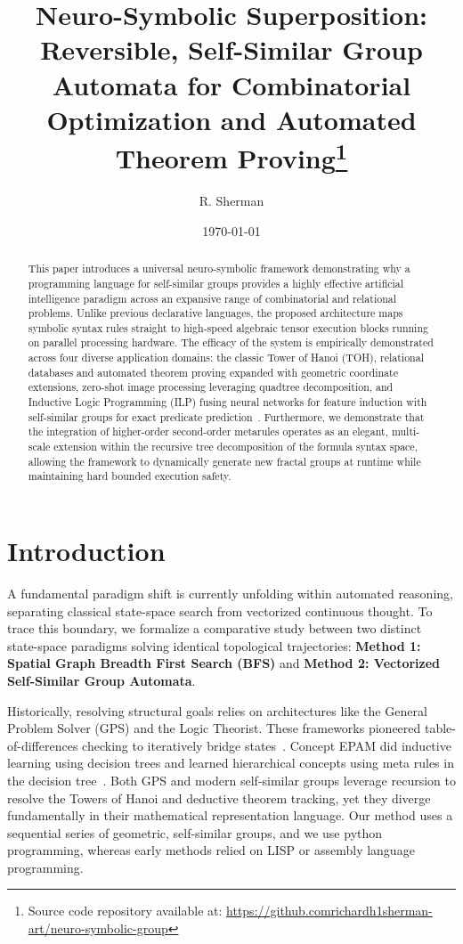 \documentclass[twocolumn]{article}
\title{Neuro-Symbolic Superposition: Reversible, Self-Similar Group Automata for Combinatorial Optimization and Automated Theorem Proving\thanks{Source code repository available at: \protect\url{https://github.com}\protect\url{richardh1sherman-art/}\protect\url{neuro-symbolic-group}}}
\author{R. Sherman}
\date{\today}
\begin{document}
\maketitle

\begin{abstract}
This paper introduces a universal neuro-symbolic framework demonstrating why a programming language for self-similar groups provides a highly effective artificial intelligence paradigm across an expansive range of combinatorial and relational problems. Unlike previous declarative languages, the proposed architecture maps symbolic syntax rules straight to high-speed algebraic tensor execution blocks running on parallel processing hardware. The efficacy of the system is empirically demonstrated across four diverse application domains: the classic Tower of Hanoi (TOH), relational databases and automated theorem proving expanded with geometric coordinate extensions, zero-shot image processing leveraging quadtree decomposition, and Inductive Logic Programming (ILP) fusing neural networks for feature induction with self-similar groups for exact predicate prediction~\cite{crespo2026}. Furthermore, we demonstrate that the integration of higher-order second-order metarules operates as an elegant, multi-scale extension within the recursive tree decomposition of the formula syntax space, allowing the framework to dynamically generate new fractal groups at runtime while maintaining hard bounded execution safety.
\end{abstract}

\section{Introduction}
A fundamental paradigm shift is currently unfolding within automated reasoning, separating classical state-space search from vectorized continuous thought. To trace this boundary, we formalize a comparative study between two distinct state-space paradigms solving identical topological trajectories: \textbf{Method 1: Spatial Graph Breadth First Search (BFS)} and \textbf{Method 2: Vectorized Self-Similar Group Automata}.

Historically, resolving structural goals relies on architectures like the General Problem Solver (GPS) and the Logic Theorist. These frameworks pioneered table-of-differences checking to iteratively bridge states~\cite{banerji1985artificial}. Concept EPAM did inductive learning using decision trees and learned hierarchical concepts using meta rules in the decision tree~\cite{sherman1969learning}. Both GPS and modern self-similar groups leverage recursion to resolve the Towers of Hanoi and deductive theorem tracking, yet they diverge fundamentally in their mathematical representation language. Our method uses a sequential series of geometric, self-similar groups, and we use python programming, whereas early methods relied on LISP or assembly language programming. 
\end{document}
